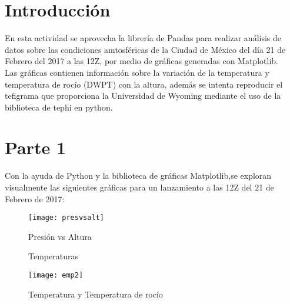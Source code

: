 \documentclass[12pt]{article}
\begin{document}
\section*{Introducción}

En esta actividad se aprovecha la librería de Pandas para realizar análisis de datos sobre las condiciones amtosféricas de la Ciudad de México del día 21 de Febrero del 2017 a las 12Z, por medio de gráficas generadas con Matplotlib.\\
Las gráficas contienen información sobre la variación de la temperatura y temperatura de rocío (DWPT) con la altura, además se intenta reproducir el tefigrama que proporciona la Universidad de Wyoming mediante el uso de la biblioteca de tephi en python.




\newpage


\section*{\center Parte 1}

Con la ayuda de Python y la biblioteca de gráficas Matplotlib,se exploran visualmente las siguientes gráficas para un lanzamiento a las 12Z del 21 de Febrero de 2017:

\begin{figure}[ht]
\texttt{[image: presvsalt]}
\centering
\caption{Presión vs Altura}
\end{figure}


\begin{figure}[H]
 \centering
    \caption{Temperaturas}
\end{figure}









\begin{figure}[ht]
\texttt{[image: emp2]}
\centering
\caption{Temperatura y Temperatura de rocío}
\end{figure}
\end{document}
